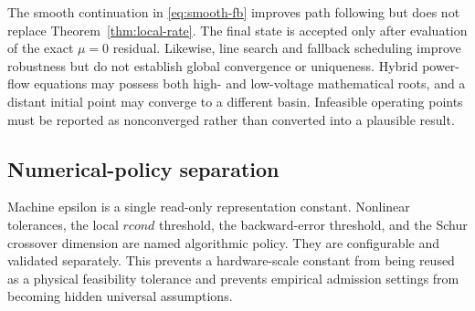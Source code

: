 The smooth continuation in \eqref{eq:smooth-fb} improves path following but
does not replace Theorem~\ref{thm:local-rate}. The final state is accepted only
after evaluation of the exact $\mu=0$ residual. Likewise, line search and
fallback scheduling improve robustness but do not establish global
convergence or uniqueness. Hybrid power-flow equations may possess both high-
and low-voltage mathematical roots, and a distant initial point may converge
to a different basin. Infeasible operating points must be reported as
nonconverged rather than converted into a plausible result.

\subsection{Numerical-policy separation}

Machine epsilon is a single read-only representation constant. Nonlinear
tolerances, the local $rcond$ threshold, the backward-error threshold, and the
Schur crossover dimension are named algorithmic policy. They are configurable
and validated separately. This prevents a hardware-scale constant from being
reused as a physical feasibility tolerance and prevents empirical admission
settings from becoming hidden universal assumptions.

